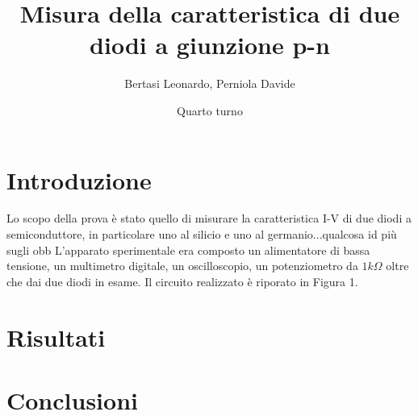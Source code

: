 \documentclass{article}
\title{Misura della caratteristica di due diodi a giunzione p-n}
\date{Quarto turno}
\author{Bertasi Leonardo, Perniola Davide }
\begin{document}
\maketitle
\section{Introduzione} 
Lo scopo della prova è stato quello di misurare la caratteristica I-V di due diodi a semiconduttore, in particolare uno al silicio e uno al germanio...qualcosa id più sugli obb
L'apparato sperimentale era composto un alimentatore di bassa tensione, un multimetro digitale, un oscilloscopio, un potenziometro da $1k\Omega$ oltre che dai due diodi in esame.
Il circuito realizzato è riporato in Figura 1.


\section{Risultati}


\section{Conclusioni}
\end{document}
